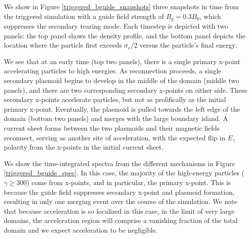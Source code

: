 \documentclass[iop,twocolappendix]{emulateapj}
\begin{document}
We show in Figure \ref{triggered_bguide_snapshots} three snapshots in time from the triggered simulation with a guide field strength of $B_{g}=0.3B_{0}$, which suppresses the secondary tearing mode.  Each timestep is depicted with two panels: the top panel shows the density profile, and the bottom panel depicts the location where the particle first exceeds $\sigma_{e}/2$ versus the particle's final energy. 

We see that at an early time (top two panels), there is a single primary x-point accelerating particles to high energies.  As reconnection proceeds, a single secondary plasmoid begins to develop in the middle of the domain (middle two panels), and there are two corresponding secondary x-points on either side.  These secondary x-points accelerate particles, but not as prolifically as the initial primary x-point.  Eventually, the plasmoid is pulled towards the left edge of the domain (bottom two panels) and merges with the large boundary island.  A current sheet forms between the two plasmoids and their magnetic fields reconnect, serving as another site of acceleration, with the expected flip in $E_{z}$ polarity from the x-points in the initial current sheet.  

We show the time-integrated spectra from the different mechanisms in Figure \ref{triggered_bguide_spec}.  In this case, the majority of the high-energy particles ($\gamma \geq 300$) come from x-points, and in particular, the primary x-point.  This is because the guide field suppresses secondary x-point and plasmoid formation, resulting in only one merging event over the course of the simulation.  We note that because acceleration is so localized in this case, in the limit of very large domains, the acceleration region will comprise a vanishing fraction of the total domain and we expect acceleration to be negligible.  

	
\end{document}
